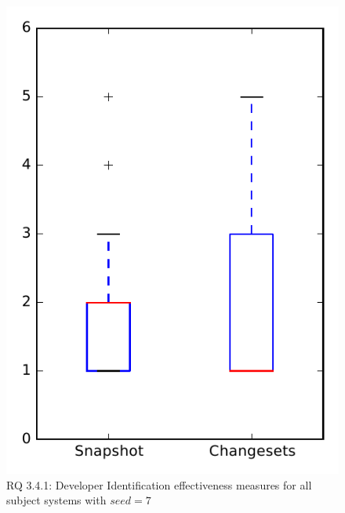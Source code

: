 
\begin{figure}
\centering
\includegraphics[height=0.4\textheight]{figures/dit_seed/rq1_overview_7}
\caption{RQ 3.4.1: Developer Identification effectiveness measures for all subject systems with $seed=7$}
\label{fig:dit_seed:rq1:overview}
\end{figure}
